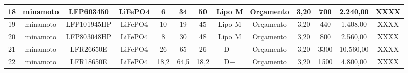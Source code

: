 \begin{table}[htp]
\begin{tabular}{|c|c|c|c|c|c|c|c|c|c|c|c|c|}
18                                               & minamoto                                    & LFP603450                                    & LiFePO4                                              & 6          & 34        & 50        & Lipo M                                                  & Orçamento                                   & 3,20                                                     & 700                                       & 2.240,00                                 & XXXX                                           \\[2pt] \hline
19                                               & minamoto                                    & LFP101945HP                                  & LiFePO4                                              & 10         & 19        & 45        & Lipo M                                                  & Orçamento                                   & 3,20                                                     & 440                                       & 1.408,00                                 & XXXX                                           \\[2pt] \hline
20                                               & minamoto                                    & LFP803048HP                                  & LiFePO4                                              & 8          & 30        & 48        & Lipo M                                                  & Orçamento                                   & 3,20                                                     & 800                                       & 2.560,00                                 & XXXX                                           \\[2pt] \hline
21                                               & minamoto                                    & LFR26650E                                    & LiFePO4                                              & 26         & 65        & 26        & D+                                                      & Orçamento                                   & 3,20                                                     & 3300                                      & 10.560,00                                & XXXX                                           \\[2pt] \hline
22                                               & minamoto                                    & LFR18650E                                    & LiFePO4                                              & 18,2       & 64,5      & 18,2      & D+                                                      & Orçamento                                   & 3,20                                                     & 1500                                      & 4.800,00                                 & XXXX                                           \\[2pt] \hline

\end{tabular}
\end{table}
